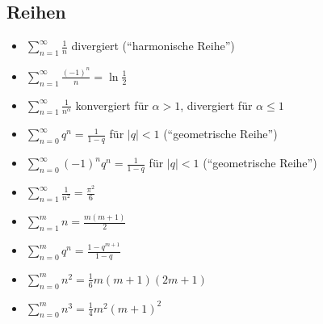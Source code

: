 \subsection{Reihen}
\begin{itemize}[leftmargin=*]
	\item $\sum_{n=1}^\infty \frac{1}{n}$ divergiert (``harmonische Reihe'')
	\item $\sum_{n=1}^\infty \frac{(-1)^n}{n} = \ln \frac{1}{2}$
	\item $\sum_{n=1}^\infty \frac{1}{n^\alpha}$ konvergiert für $\alpha > 1$,
	divergiert für $\alpha \leq 1$
	\item $\sum_{n=0}^\infty q^n = \frac{1}{1-q}$ für $|q| < 1$ (``geometrische
	Reihe'')
	\item $\sum_{n=0}^\infty (-1)^n q^n = \frac{1}{1-q}$ für $|q| < 1$ (``geometrische
	Reihe'')
	\item $\sum_{n=1}^\infty \frac{1}{n^2} = \frac{\pi^2}{6}$
	\newline
	\item $\sum_{n=1}^m n = \frac{m(m+1)}{2}$
	\item $\sum_{n=0}^m q^n = \frac{1-q^{m+1}}{1-q}$ 
	\item  $\sum_{n=0}^m n^2 = \frac{1}{6}m(m+1)(2m+1)$
	\item  $\sum_{n=0}^m n^3 = \frac{1}{4}m^2(m+1)^2$
\end{itemize}

